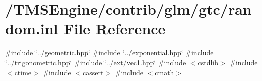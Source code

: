 \hypertarget{random_8inl}{}\section{/\+T\+M\+S\+Engine/contrib/glm/gtc/random.inl File Reference}
\label{random_8inl}
{\ttfamily \#include \char`\"{}../geometric.\+hpp\char`\"{}}\newline
{\ttfamily \#include \char`\"{}../exponential.\+hpp\char`\"{}}\newline
{\ttfamily \#include \char`\"{}../trigonometric.\+hpp\char`\"{}}\newline
{\ttfamily \#include \char`\"{}../ext/vec1.\+hpp\char`\"{}}\newline
{\ttfamily \#include $<$cstdlib$>$}\newline
{\ttfamily \#include $<$ctime$>$}\newline
{\ttfamily \#include $<$cassert$>$}\newline
{\ttfamily \#include $<$cmath$>$}\newline
